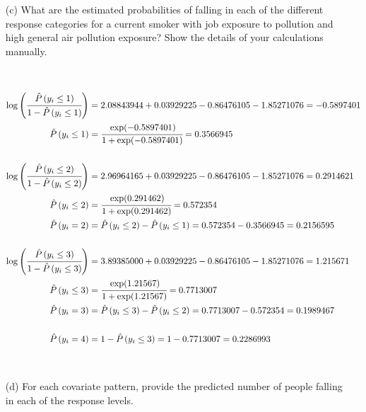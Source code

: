 \documentclass[]{article}
\begin{document}
\begin{itemize}
\item[(c)]  What are the estimated probabilities of falling in each of the different response categories for a current smoker with job exposure to pollution and high general air pollution exposure?  Show the details of your calculations manually.

\ 


 \begin{align*}
     \log \left( \cfrac{\hat{P}\left(y_i \leq 1\right)}{1-\hat{P}\left(y_i \leq 1\right)} \right) &=
        2.08843944  +  0.03929225   -0.86476105   -1.85271076 = -0.5897401 \\
        \hat{P}\left(y_i \leq 1\right) &= \cfrac{\exp(-0.5897401)}{1+\exp(-0.5897401)} = 0.3566945 \\
        \\
    \log \left( \cfrac{\hat{P}\left(y_i \leq 2\right)}{1-\hat{P}\left(y_i \leq 2\right)} \right) &=
        2.96964165 +   0.03929225   -0.86476105   -1.85271076 = 0.2914621 \\
        \hat{P}\left(y_i \leq 2\right) &= \cfrac{\exp(0.291462)}{1+\exp(0.291462)} = 0.572354 \\ 
        \hat{P}\left(y_i = 2\right) &=   \hat{P}\left(y_i \leq 2\right) -   \hat{P}\left(y_i \leq 1\right) =
        0.572354 - 0.3566945 = 0.2156595 \\ 
                \\
    \log \left( \cfrac{\hat{P}\left(y_i \leq 3\right)}{1-\hat{P}\left(y_i \leq 3\right)} \right) &=
       3.89385000  +   0.03929225   -0.86476105   -1.85271076 = 1.215671 \\
        \hat{P}\left(y_i \leq 3\right) &= \cfrac{\exp(1.21567)}{1+\exp(1.21567)} =  0.7713007 \\ 
        \hat{P}\left(y_i = 3\right) &=   \hat{P}\left(y_i \leq 3\right) -   \hat{P}\left(y_i \leq 2\right) =
        0.7713007 - 0.572354  =0.1989467 \\ 
        \\
      \hat{P}\left(y_i = 4\right) &=  1-   \hat{P}\left(y_i \leq 3\right) =    1-    0.7713007   = 0.2286993
 \end{align*} 
 
\end{itemize}

~

\begin{itemize}
\item[(d)]  For each covariate pattern, provide the predicted number of people falling in each of the response levels.
\end{itemize}
\end{document}
